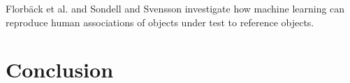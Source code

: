 \documentclass[conference]{IEEEtran}
\begin{document}
Florbäck et al. \cite{Florbaeck2016.matching.offline} and Sondell and Svensson \cite{Sondell2018} investigate how machine learning can reproduce human associations of objects under test to reference objects.


\section{Conclusion}
\label{sec:conclusion}



%
% 
% 
% 
% 
% 


{\small


}
\end{document}
